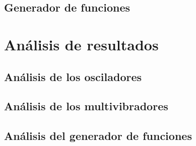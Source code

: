 \documentclass{article}
\begin{document}
\subsection{Generador de funciones}
\label{sec:resultados-generador-funciones}

\FloatBarrier

\section{Análisis de resultados}
\subsection{Análisis de los  osciladores}

\FloatBarrier
\subsection{Análisis de los multivibradores}

\FloatBarrier
\subsection{Análisis del generador de funciones}


\FloatBarrier


\FloatBarrier
% 
\printbibliography[heading=bibintoc, title={Bibliografía}]
\end{document}
